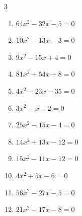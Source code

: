 \begin{multicols}{3}
\begin{enumerate}

  \item $64x^{2}-32x-5=0$


  \item $10x^{2}-13x-3=0$


  \item $9x^{2}-15x+4=0$


  \item $81x^{2}+54x+8=0$


  \item $4x^{2}-23x-35=0$


\columnbreak %

  \item $3x^{2}-x-2=0$


  \item $25x^{2}-15x-4=0$


  \item $14x^{2}+13x-12=0$


  \item $15x^{2}-11x-12=0$


  \item $4x^{2}+5x-6=0$


  \item $56x^{2}-27x-5=0$


  \item $21x^{2}-17x-8=0$



\end{enumerate}
\end{multicols}
